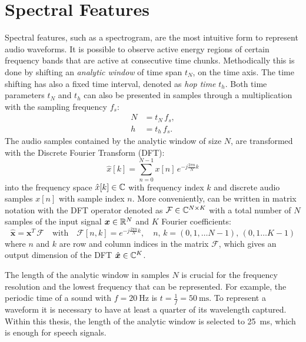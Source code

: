 
\section{Spectral Features}\label{sec:signal_spec}
\thesisStateRevised
Spectral features, such as a spectrogram, are the most intuitive form to represent audio waveforms. 
It is possible to observe active energy regions of certain frequency bands that are active at consecutive time chunks.
Methodically this is done by shifting an \emph{analytic window} of time span $t_N$, on the time axis.
The time shifting has also a fixed time interval, denoted as \emph{hop time} $t_{h}$.
Both time parameters $t_N$ and $t_h$ can also be presented in samples through a multiplication with the sampling frequency $f_s$:
\begin{equation}
  \begin{split}
    N &= t_N \, f_s, \\
    h &= t_h \, f_s.
  \end{split}
\end{equation}
The audio samples contained by the analytic window of size $N$, are transformed with the Discrete Fourier Transform (DFT):
\begin{equation}\label{eq:signal_spec_dtft}
  \hat{x}[k] = \sum_{n=0}^{N-1} x[n] \, e^{-j\frac{2 \pi n}{N}k}
\end{equation}
into the frequency space $\hat{x}[k] \in \mathbb{C}$ with frequency index $k$ and discrete audio samples $x[n]$ with sample index $n$.
More conveniently,  can be written in matrix notation with the DFT operator denoted as $\mathcal{F} \in \mathbb{C}^{N \times K}$ with a total number of $N$ samples of the input signal $\bm{x} \in \mathbb{R}^N$ and $K$ Fourier coefficients:
\begin{equation}\label{eq:signal_spec_dtft_matrix}
  \hat{\bm{x}} = \bm{x}^T \, \mathcal{F} \quad \mathrm{with} 
  \quad \mathcal{F}[n, k] = e^{-j\frac{2 \pi n}{N} k},
  \quad n,\, k = (0, 1, \dots N-1),\, (0, 1 \dots K-1)
\end{equation}
where $n$ and $k$ are row and column indices in the matrix $\mathcal{F}$, which gives an output dimension of the DFT $\hat{\bm{x}} \in \mathbb{C}^K$.

The length of the analytic window in samples $N$ is crucial for the frequency resolution and the lowest frequency that can be represented.
For example, the periodic time of a sound with $f=\SI{20}{\hertz}$ is $t=\frac{1}{f} = \SI{50}{\milli\second}$.
To represent a waveform it is necessary to have at least a quarter of its wavelength captured.
Within this thesis, the length of the analytic window is selected to \SI{25}{\milli\second}, which is enough for speech signals.


